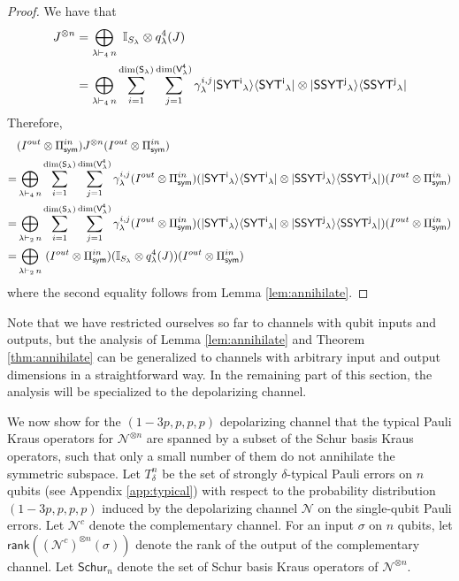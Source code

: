\documentclass[11pt]{article}
\DeclarePairedDelimiter\bra{\langle}{\rvert}
\DeclarePairedDelimiter\ket{\lvert}{\rangle}
\begin{document}
\begin{proof}
    We have that
    \begin{align*}
        J^{\otimes n} &= \bigoplus_{\lambda\vdash_4\,n}~\mathbb{I}_{S_{\lambda}} \otimes q^4_{\lambda}(J) \\
        &= \bigoplus_{\lambda\vdash_4\,n} \sum_{i = 1}^{\mathsf{\dim(S_{\lambda})}}\sum_{j = 1}^{\mathsf{\dim(V^4_{\lambda})}} \gamma_{\lambda}^{i, j} \ket{\mathsf{SYT^i}_\lambda} \bra{\mathsf{SYT^i}_\lambda} \otimes \ket{\mathsf{SSYT^j}_\lambda}\bra{\mathsf{SSYT^j}_\lambda}
    \end{align*}
    Therefore,
    \begin{align*}
        &(I^{out} \otimes \Pi_{\mathsf{sym}}^{in}) J^{\otimes n} (I^{out} \otimes \Pi_{\mathsf{sym}}^{in}) \\
        =& \bigoplus_{\lambda\vdash_4\,n} \sum_{i = 1}^{\mathsf{\dim(S_{\lambda})}}\sum_{j = 1}^{\mathsf{\dim(V^4_{\lambda})}} \gamma_{\lambda}^{i, j} (I^{out} \otimes \Pi_{\mathsf{sym}}^{in})(\ket{\mathsf{SYT^i}_\lambda} \bra{\mathsf{SYT^i}_\lambda} \otimes \ket{\mathsf{SSYT^j}_\lambda}\bra{\mathsf{SSYT^j}_\lambda})(I^{out} \otimes \Pi_{\mathsf{sym}}^{in}) \\
        =& \bigoplus_{\lambda\vdash_2\,n} \sum_{i = 1}^{\mathsf{\dim(S_{\lambda})}}\sum_{j = 1}^{\mathsf{\dim(V^4_{\lambda})}} \gamma_{\lambda}^{i, j} (I^{out} \otimes \Pi_{\mathsf{sym}}^{in})(\ket{\mathsf{SYT^i}_\lambda} \bra{\mathsf{SYT^i}_\lambda} \otimes \ket{\mathsf{SSYT^j}_\lambda}\bra{\mathsf{SSYT^j}_\lambda})(I^{out} \otimes \Pi_{\mathsf{sym}}^{in}) \\
        =& \bigoplus_{\lambda\vdash_2\,n}~(I^{out} \otimes \Pi_{\mathsf{sym}}^{in})(\mathbb{I}_{S_{\lambda}} \otimes q^4_{\lambda}(J))(I^{out} \otimes \Pi_{\mathsf{sym}}^{in})
    \end{align*}
    where the second equality follows from Lemma \ref{lem:annihilate}.
\end{proof}
Note that we have restricted ourselves so far to channels with qubit inputs and outputs, but the analysis of Lemma \ref{lem:annihilate} and Theorem \ref{thm:annihilate} can be generalized to channels with arbitrary input and output dimensions in a straightforward way. In the remaining part of this section, the analysis will be specialized to the depolarizing channel.

We now show for the $(1-3p, p, p, p)$ depolarizing channel that the typical Pauli Kraus operators for $\mathcal{N}^{\otimes n}$ are spanned by a subset of the Schur basis Kraus operators, such that only a small number of them do not annihilate the symmetric subspace. Let $T_{\delta}^n$ be the set of strongly $\delta$-typical Pauli errors on $n$ qubits (see Appendix \ref{app:typical}) with respect to the probability distribution $(1-3p, p, p, p)$ induced by the depolarizing channel $\mathcal{N}$ on the single-qubit Pauli errors. Let $\mathcal{N}^c$ denote the complementary channel. For an input $\sigma$ on $n$ qubits, let $\mathsf{rank}((\mathcal{N}^c)^{\otimes n}(\sigma))$ denote the rank of the output of the complementary channel. Let $\mathsf{Schur}_n$ denote the set of Schur basis Kraus operators of $\mathcal{N}^{\otimes n}$.
\end{document}
